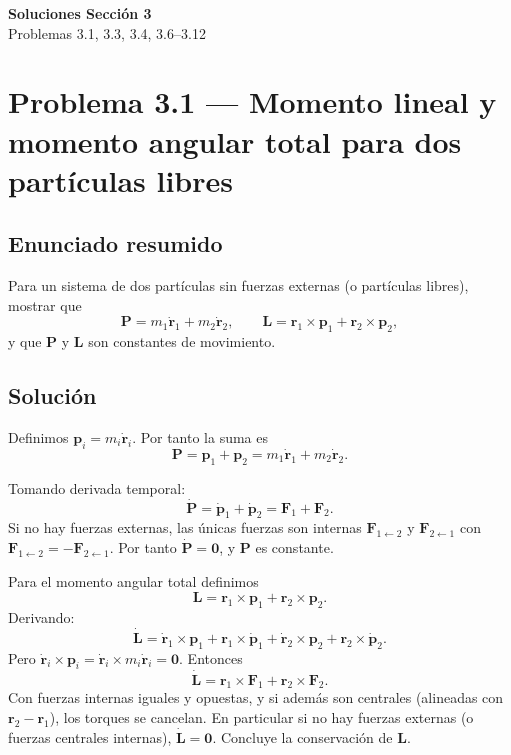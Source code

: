 \documentclass[12pt]{article}
\begin{document}
\begin{center}
    \LARGE \textbf{Soluciones Sección 3}\\
    \Large Problemas 3.1, 3.3, 3.4, 3.6--3.12
\end{center}

\vspace{1em}

\section*{Problema 3.1 — Momento lineal y momento angular total para dos partículas libres}
\subsection*{Enunciado resumido}
Para un sistema de dos partículas sin fuerzas externas (o partículas libres), mostrar que
\[
\mathbf{P} = m_1\dot{\mathbf r}_1 + m_2\dot{\mathbf r}_2,
\qquad
\mathbf{L} = \mathbf r_1\times\mathbf p_1 + \mathbf r_2\times\mathbf p_2,
\]
y que \(\mathbf P\) y \(\mathbf L\) son constantes de movimiento.

\subsection*{Solución}
Definimos \(\mathbf p_i = m_i\dot{\mathbf r}_i\). Por tanto la suma es
\[
\mathbf P = \mathbf p_1 + \mathbf p_2 = m_1\dot{\mathbf r}_1 + m_2\dot{\mathbf r}_2.
\]

Tomando derivada temporal:
\[
\dot{\mathbf P} = \dot{\mathbf p}_1 + \dot{\mathbf p}_2 = \mathbf F_1 + \mathbf F_2.
\]
Si no hay fuerzas externas, las únicas fuerzas son internas \(\mathbf F_{1\leftarrow2}\) y \(\mathbf F_{2\leftarrow1}\) con
\(\mathbf F_{1\leftarrow2} = -\mathbf F_{2\leftarrow1}\). Por tanto \(\dot{\mathbf P}=\mathbf0\), y \(\mathbf P\) es constante.

Para el momento angular total definimos
\[
\mathbf L = \mathbf r_1\times\mathbf p_1 + \mathbf r_2\times\mathbf p_2.
\]
Derivando:
\[
\dot{\mathbf L} = \dot{\mathbf r}_1\times \mathbf p_1 + \mathbf r_1\times\dot{\mathbf p}_1
+ \dot{\mathbf r}_2\times \mathbf p_2 + \mathbf r_2\times\dot{\mathbf p}_2.
\]
Pero \(\dot{\mathbf r}_i\times\mathbf p_i=\dot{\mathbf r}_i\times m_i\dot{\mathbf r}_i=\mathbf0\). Entonces
\[
\dot{\mathbf L} = \mathbf r_1\times\mathbf F_1 + \mathbf r_2\times\mathbf F_2.
\]
Con fuerzas internas iguales y opuestas, y si además son centrales (alineadas con \(\mathbf r_2-\mathbf r_1\)), los torques se cancelan. En particular si no hay fuerzas externas (o fuerzas centrales internas), \(\dot{\mathbf L}=\mathbf0\). Concluye la conservación de \(\mathbf L\).
\end{document}
